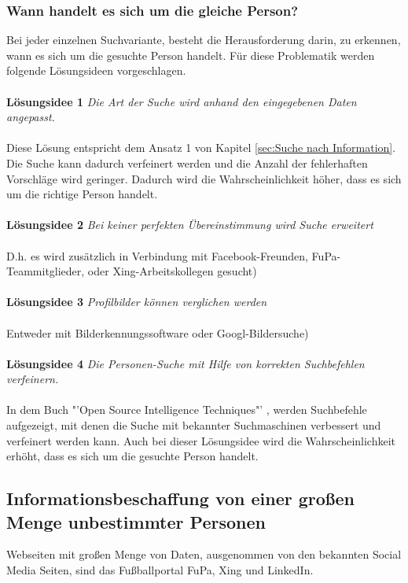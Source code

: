		\subsubsection{Wann handelt es sich um die gleiche Person?}
		Bei jeder einzelnen Suchvariante, besteht die Herausforderung darin, zu erkennen, wann es sich um die gesuchte Person handelt. Für diese Problematik werden folgende Lösungsideen vorgeschlagen.\\\\
		{\bf Lösungsidee 1} \textit{Die Art der Suche wird anhand den eingegebenen Daten angepasst.}\\\\
		Diese Lösung entspricht dem Ansatz 1 von Kapitel \ref{sec:Suche nach Information}. Die Suche kann dadurch verfeinert werden und die Anzahl der fehlerhaften Vorschläge wird geringer. Dadurch wird die Wahrscheinlichkeit höher, dass es sich um die richtige Person handelt.\\\\
		{\bf Lösungsidee 2} \textit{Bei keiner perfekten Übereinstimmung wird Suche erweitert}\\\\
		D.h. es wird zusätzlich in Verbindung mit Facebook-Freunden, FuPa-Teammitglieder, oder Xing-Arbeitskollegen gesucht)\\\\
		{\bf Lösungsidee 3} \textit{Profilbilder können verglichen werden}\\\\ Entweder mit Bilderkennungssoftware oder Googl-Bildersuche)\\\\
		{\bf Lösungsidee 4} \textit{Die Personen-Suche mit Hilfe von korrekten Suchbefehlen verfeinern.}\\\\
		In dem Buch "'Open Source Intelligence Techniques"' \cite{Bazzell}, werden Suchbefehle aufgezeigt, mit denen die Suche mit bekannter Suchmaschinen verbessert und verfeinert werden kann. Auch bei dieser Lösungsidee wird die Wahrscheinlichkeit erhöht, dass es sich um die gesuchte Person handelt. %
		
	\subsection{Informationsbeschaffung von einer großen Menge unbestimmter Personen}
	Webseiten mit großen Menge von Daten, ausgenommen von den bekannten Social Media Seiten, sind das Fußballportal FuPa, Xing und LinkedIn.
	
